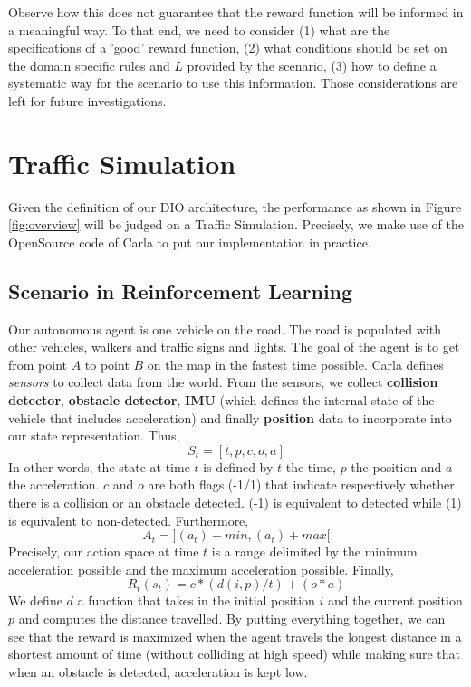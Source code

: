 \documentclass[a4paper,11pt]{article}
\theoremstyle{definition}
\begin{document}
Observe how this does not guarantee that the reward function will be informed in a meaningful way.
To that end, we need to consider (1) what are the specifications of a 'good' reward function, (2) what conditions should be set 
on the domain specific rules and $L$ provided by the scenario, (3) how to define a systematic way for the scenario to use 
this information. Those considerations are left for future investigations. 
 

\section{Traffic Simulation} \label{traffic}
Given the definition of our DIO architecture, the performance as shown in Figure \ref{fig:overview} will be judged on a Traffic Simulation. 
Precisely, we make use of the OpenSource code of Carla \cite{Dosovitskiy17} to put our implementation in practice. 
\subsection{Scenario in Reinforcement Learning}
Our autonomous agent is one vehicle on the road. The road is populated with other vehicles, walkers and traffic signs and lights. 
The goal of the agent is to get from point $A$ to point $B$ on the map in the fastest time possible. Carla defines \emph{sensors} to collect 
data from the world. From the sensors, we collect \textbf{collision detector}, \textbf{obstacle detector}, \textbf{IMU} (which defines the internal state of the vehicle that includes acceleration)
and finally \textbf{position} data to incorporate into our state representation. Thus, 
\begin{equation*}
  S_t = [t, p, c, o, a]
\end{equation*} 
In other words, the state at time $t$ is defined by $t$ the time, $p$ the position and $a$ the acceleration. $c$ and $o$ are both flags (-1/1) that indicate 
respectively whether there is a collision or an obstacle detected. (-1) is equivalent to detected while (1) is equivalent to non-detected. Furthermore, 
\begin{equation*}
  A_t = ](a_t)-min, (a_t)+max[
\end{equation*}
Precisely, our action space at time $t$ is a range delimited by the minimum acceleration possible and the maximum acceleration possible. Finally, 
\begin{equation*}
  R_t(s_t) = c * (d(i, p)/t) + (o * a)
\end{equation*}
We define $d$ a function that takes in the initial position $i$ and the current position $p$ and computes the distance travelled. 
By putting everything together, we can see that the reward is maximized when the agent travels the longest distance in a shortest 
amount of time (without colliding at high speed) while making sure that when an obstacle is detected, acceleration is kept low. 
\end{document}
